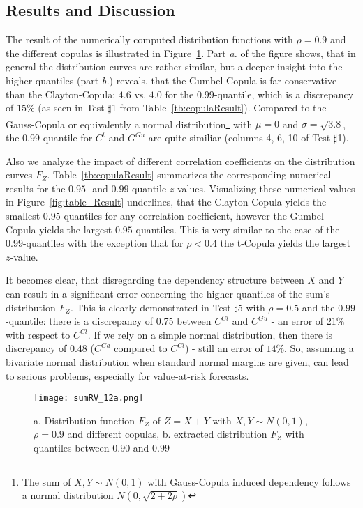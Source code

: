 \documentclass[a4paper]{article}
\begin{document}
\subsection{Results and Discussion}

The result of the numerically computed distribution functions with $\rho = 0.9$ and the different copulas is illustrated in Figure~\ref{fig:CDF_sum}. 
Part {\it a.} of the figure shows, that in general the distribution curves are rather similar, but a deeper insight into the higher quantiles (part {\it b.}) reveals, that the Gumbel-Copula is far conservative than the Clayton-Copula: $4.6$ vs. $4.0$ for the $0.99$-quantile, which is a discrepancy of $15\%$ (as seen in Test $\sharp$1 from Table~\ref{tb:copulaResult}). Compared to the Gauss-Copula or equivalently a normal distribution\footnote{\footnotesize{The sum of $X, Y \sim N(0,1)$ with Gauss-Copula induced dependency follows a normal distribution $N(0,\sqrt{2+2\rho})$}} with $\mu=0$ and $\sigma=\sqrt{3.8}$, the $0.99$-quantile for $C^t$ and $G^{Gu}$ are quite similiar (columns 4, 6, 10 of Test $\sharp$1). 



Also we analyze the impact of different correlation coefficients on the distribution curves $F_Z$. Table~\ref{tb:copulaResult} summarizes the corresponding numerical results for the $0.95$- and $0.99$-quantile $z$-values. Visualizing these numerical values in Figure~\ref{fig:table_Result} underlines, that the Clayton-Copula yields the smallest $0.95$-quantiles for any correlation coefficient, however the Gumbel-Copula yields the largest $0.95$-quantiles. This is very similar to the case of the $0.99$-quantiles with the exception that for $\rho < 0.4$ the t-Copula yields the largest $z$-value.

It becomes clear, that disregarding the dependency structure between $X$ and $Y$ can result in a significant error concerning the higher quantiles of the sum's distribution $F_Z$. This is clearly demonstrated in Test $\sharp$5 with $\rho=0.5$ and the $0.99$-quantile: there is a discrepancy of 0.75 between $C^{Cl}$ and $C^{Gu}$ - an error of $21\%$ with respect to $C^{Cl}$. If we rely on a simple normal distribution, then there is discrepancy of 0.48 ($C^{Ga}$ compared to $C^{Cl}$) - still an error of $14\%$. So, assuming a bivariate normal distribution when standard normal margins are given, can lead to serious problems, especially for value-at-risk forecasts.
       
\begin{figure}[h]
       	\texttt{[image: sumRV\_12a.png]}
       	\caption{\small a. Distribution function $F_Z$ of $Z=X+Y$ with $X, Y \sim N(0,1)$, $\rho=0.9$ and different copulas, b. extracted distribution $F_Z$ with quantiles between $0.90$ and $0.99$}
       	\label{fig:CDF_sum}       
\end{figure}
       
\end{document}

